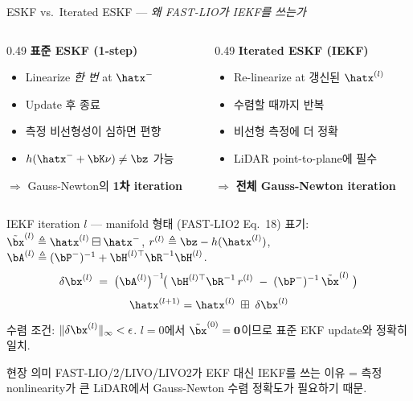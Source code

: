 \begin{frame}[shrink=20]{ESKF vs.\ Iterated ESKF — \emph{왜 FAST-LIO가 IEKF를 쓰는가}}
  \begin{columns}[T]
    \begin{column}{0.49\textwidth}
      \textbf{표준 ESKF (1-step)}
      \begin{itemize}\footnotesize
        \item Linearize \emph{한 번} at $\hatx^-$
        \item Update 후 종료
        \item 측정 비선형성이 심하면 편향
        \item $h(\hatx^- + \bK\nu) \neq \bz$ 가능
      \end{itemize}
      $\Rightarrow$ Gauss-Newton의 \textbf{1차 iteration}
    \end{column}
    \begin{column}{0.49\textwidth}
      \textbf{Iterated ESKF (IEKF)}
      \begin{itemize}\footnotesize
        \item Re-linearize at 갱신된 $\hatx^{(l)}$
        \item 수렴할 때까지 반복
        \item 비선형 측정에 더 정확
        \item LiDAR point-to-plane에 필수
      \end{itemize}
      $\Rightarrow$ \textbf{전체 Gauss-Newton iteration}
    \end{column}
  \end{columns}

  \pause
  \vspace{0.4em}
  \begin{block}{IEKF iteration $l$ — manifold 형태 (FAST-LIO2 Eq.~18)}
    \footnotesize 표기: $\tilde\bx^{(l)} \triangleq \hatx^{(l)} \boxminus \hatx^-$,\quad
    $r^{(l)} \triangleq \bz - h(\hatx^{(l)})$,\quad
    $\bA^{(l)} \triangleq (\bP^-)^{-1} + \bH^{(l)\top}\bR^{-1}\bH^{(l)}$.
    \[
      \delta\bx^{(l)}
      \;=\; \bigl(\bA^{(l)}\bigr)^{-1}\!
            \bigl(\;\bH^{(l)\top}\bR^{-1}\,r^{(l)}\;-\;(\bP^-)^{-1}\,\tilde\bx^{(l)}\;\bigr)
    \]
    \[
      \hatx^{(l+1)} = \hatx^{(l)} \;\boxplus\; \delta\bx^{(l)}
    \]
    \footnotesize 수렴 조건: $\|\delta\bx^{(l)}\|_\infty < \epsilon$. $l=0$에서 $\tilde\bx^{(0)}=\mathbf{0}$이므로 표준 EKF update와 정확히 일치.
  \end{block}

  \pause
  \begin{exampleblock}{현장 의미}
    FAST-LIO/2/LIVO/LIVO2가 EKF 대신 IEKF를 쓰는 이유 =
    측정 nonlinearity가 큰 LiDAR에서 Gauss-Newton 수렴 정확도가 필요하기 때문.
  \end{exampleblock}
\end{frame}

